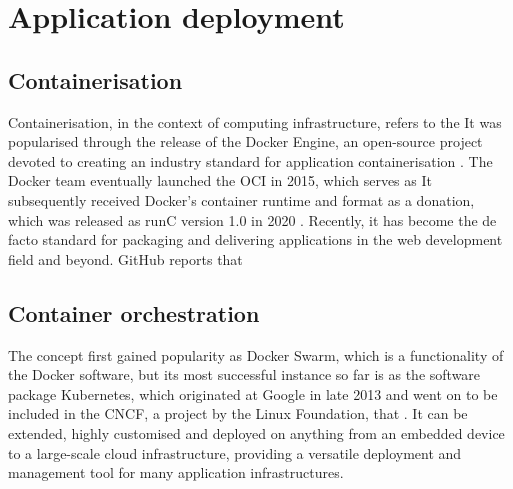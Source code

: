 \section{Application deployment}

\subsection{Containerisation}

Containerisation, in the context of computing infrastructure, refers to the  It was popularised through the release of the Docker Engine, an open-source project devoted to creating an industry standard for application containerisation \parencite{dockerRelease}. The Docker team eventually launched the \ac{OCI} in 2015, which serves as  It subsequently received Docker's container runtime and format as a donation, which was released as runC version 1.0 in 2020 \parencite{openContainerInitiative}. Recently, it has become the de facto standard for packaging and delivering applications in the web development field and beyond. GitHub reports that 

\subsection{Container orchestration}

 The concept first gained popularity as Docker Swarm, which is a functionality of the Docker software, but its most successful instance so far is as the software package Kubernetes, which originated at Google in late 2013 \parencite{kubernetesHistory} and went on to be included in the \ac{CNCF}, a project by the Linux Foundation, that . It can be extended, highly customised and deployed on anything from an embedded device to a large-scale cloud infrastructure, providing a versatile deployment and management tool for many application infrastructures.
